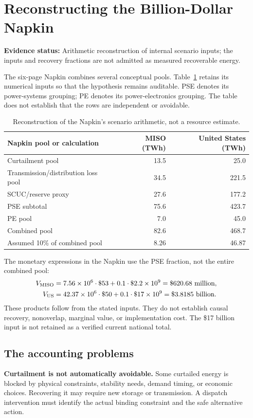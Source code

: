 \documentclass[11pt,letterpaper]{article}
\newcommand{\status}[1]{\textbf{Evidence status:} #1}
\begin{document}
\section{Reconstructing the Billion-Dollar Napkin}
\label{sec:napkin}
\status{Arithmetic reconstruction of internal scenario inputs; the inputs and recovery fractions are not admitted as measured recoverable energy.}

The six-page Napkin combines several conceptual pools.\cite{napkin} Table~\ref{tab:napkin} retains its numerical inputs so that the hypothesis remains auditable. PSE denotes its power-systems grouping; PE denotes its power-electronics grouping. The table does not establish that the rows are independent or avoidable.

\begin{table}[ht]
\centering
\begin{tabular}{lrr}
\toprule Napkin pool or calculation & MISO (TWh) & United States (TWh)\\\midrule
Curtailment pool &13.5&25.0\\
Transmission/distribution loss pool &34.5&221.5\\
SCUC/reserve proxy &27.6&177.2\\
PSE subtotal &75.6&423.7\\
PE pool &7.0&45.0\\
Combined pool &82.6&468.7\\
Assumed 10\% of combined pool &8.26&46.87\\
\bottomrule
\end{tabular}
\caption{Reconstruction of the Napkin's scenario arithmetic, not a resource estimate.}\label{tab:napkin}
\end{table}

The monetary expressions in the Napkin use the PSE fraction, not the entire combined pool:
\begin{align*}
 V_{\rm MISO}&=7.56\times10^6\cdot\$53+0.1\cdot\$2.2\times10^9
                  =\$620.68\text{ million},\\
 V_{\rm US}&=42.37\times10^6\cdot\$50+0.1\cdot\$17\times10^9
                  =\$3.8185\text{ billion}.
\end{align*}
These products follow from the stated inputs. They do not establish causal recovery, nonoverlap, marginal value, or implementation cost. The \$17 billion input is not retained as a verified current national total.

\subsection{The accounting problems}
\textbf{Curtailment is not automatically avoidable.} Some curtailed energy is blocked by physical constraints, stability needs, demand timing, or economic choices. Recovering it may require new storage or transmission. A dispatch intervention must identify the actual binding constraint and the safe alternative action.
\end{document}
